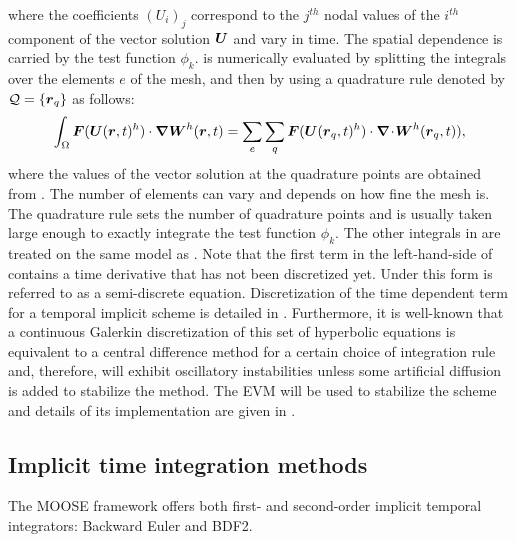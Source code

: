 where the coefficients $(U_i)_j$ correspond to the $j^{th}$ nodal values of the $i^{th}$ component of the vector solution $\boldsymbol U$ and vary in time. The spatial dependence is carried by the test function $\phi_k$.  is numerically evaluated by splitting the integrals over the elements $e$ of the mesh, and then by using a quadrature rule denoted by $\mathcal{Q} = \left\{ \boldsymbol r_q \right\}$ as follows:
%
\begin{align}\label{en:va_system_weak5}
\int_\Omega \boldsymbol F(\boldsymbol U(\boldsymbol r, t)^h) \cdot \boldsymbol{\nabla} \boldsymbol W^h(\boldsymbol r, t) = \sum_e \sum_q \boldsymbol F(\boldsymbol U(\boldsymbol r_q, t)^h) \cdot \boldsymbol{\nabla}\! \cdot \! \boldsymbol W^h (\boldsymbol r_q, t)),
\end{align}
%
where the values of the vector solution at the quadrature points are obtained from . The number of elements can vary and depends on how fine the mesh is. The quadrature rule sets the number of quadrature points and is usually taken large enough to exactly integrate the test function $\phi_k$. The other integrals in  are treated on the same model as . Note that the first term in the left-hand-side of   contains a time derivative that has not been discretized yet. Under this form  is referred to as a semi-discrete equation. Discretization of the time dependent term for a temporal implicit scheme is detailed in .
Furthermore, it is well-known
that a continuous Galerkin discretization of this set of hyperbolic
equations is equivalent to a central difference method for a certain
choice of integration rule and, therefore, will exhibit oscillatory
instabilities unless some artificial diffusion is added to stabilize
the method. The EVM will be used to stabilize the scheme and details of its implementation are given in .
\subsection{Implicit time integration methods}\label{sec:temp_implicit}
The MOOSE framework offers both first- and second-order implicit temporal integrators: Backward Euler and BDF2.
